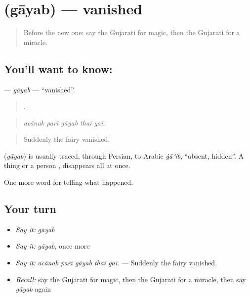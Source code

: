 \section[\texorpdfstring{\gu{ગાયબ} (gāyab)}{ગાયબ (gāyab)}]{ (gāyab) — vanished}

\label{lesson:GU-C333-gayab}



\begin{quote}
Before the new one: say the Gujarati for magic, then the Gujarati for a miracle.
\end{quote}

\subsection*{You'll want to know: }
\textbf{} — \emph{gāyab} — \textquotedblleft{}vanished\textquotedblright{}.

\begin{quote}
    .
\end{quote}

\begin{quote}
\emph{acānak parī gāyab thaī gaī.}
\end{quote}

\begin{quote}
Suddenly the fairy vanished.
\end{quote}

\begin{cousinweb}
\textbf{} (\emph{gāyab}) is usually traced, through Persian, to Arabic \emph{ġāʾib}, \textquotedblleft{}absent, hidden\textquotedblright{}. A thing or a person \textbf{  }, disappears all at once.
\end{cousinweb}

\begin{grammarlens}[title={What you've built}]
One more word for telling what happened.
\end{grammarlens}

\subsection*{Your turn}
\begin{itemize}
\raggedright
  \item \emph{Say it:} \emph{gāyab}
  \item \emph{Say it:} \emph{gāyab}, once more
  \item \emph{Say it:} \emph{acānak parī gāyab thaī gaī.} — Suddenly the fairy vanished.
  \item \emph{Recall:} say the Gujarati for magic, then the Gujarati for a miracle, then say \emph{gāyab} again
\end{itemize}

